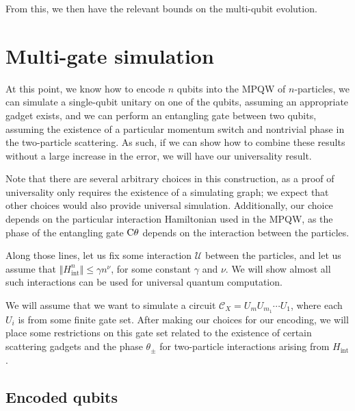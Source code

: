 \documentclass[../thesis-main/thesis-main]{subfiles}
\begin{document}
From this, we then have the relevant bounds on the multi-qubit evolution.

%

%

\section{Multi-gate simulation}

At this point, we know how to encode $n$ qubits into the MPQW of $n$-particles, we can simulate a single-qubit unitary on one of the qubits, assuming an appropriate gadget exists, and we can perform an entangling gate between two qubits, assuming the existence of a particular momentum switch and nontrivial phase in the two-particle scattering.  As such, if we can show how to combine these results without a large increase in the error, we will have our universality result.

Note that there are several arbitrary choices in this construction, as a proof of universality only requires the existence of a simulating graph; we expect that other choices would also provide universal simulation.  Additionally, our choice depends on the particular interaction Hamiltonian used in the MPQW, as the phase of the entangling gate $\mathrm{C}\theta$ depends on the interaction between the particles.  

Along those lines, let us fix some interaction $\mathcal{U}$ between the particles, and let us assume that $\Vert H_{\text{int}}^n \Vert \leq \gamma n^\nu$, for some constant $\gamma$ and $\nu$.  We will show almost all such interactions can be used for universal quantum computation.

We will assume that we want to simulate a circuit $\mathcal{C}_X = U_mU_{m_1}\cdots U_1$, where each $U_i$ is from some finite gate set.  After making our choices for our encoding, we will place some restrictions on this gate set related to the existence of certain scattering gadgets and the phase $\theta_{\pm}$ for two-particle interactions arising from $H_{\text{int}}$.

\subsection{Encoded qubits}
\end{document}
